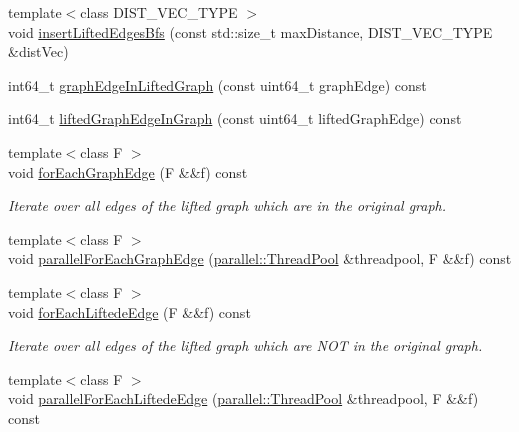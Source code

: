 \begin{DoxyCompactItemize}
\item 
{\footnotesize template$<$class D\+I\+S\+T\+\_\+\+V\+E\+C\+\_\+\+T\+Y\+PE $>$ }\\void \hyperlink{classnifty_1_1graph_1_1opt_1_1lifted__multicut_1_1LiftedMulticutObjective_ab60b55144adaaa6b75e5423b87304292}{insert\+Lifted\+Edges\+Bfs} (const std\+::size\+\_\+t max\+Distance, D\+I\+S\+T\+\_\+\+V\+E\+C\+\_\+\+T\+Y\+PE \&dist\+Vec)
\item 
int64\+\_\+t \hyperlink{classnifty_1_1graph_1_1opt_1_1lifted__multicut_1_1LiftedMulticutObjective_aef06530949ae4adf558b068481d681bb}{graph\+Edge\+In\+Lifted\+Graph} (const uint64\+\_\+t graph\+Edge) const
\item 
int64\+\_\+t \hyperlink{classnifty_1_1graph_1_1opt_1_1lifted__multicut_1_1LiftedMulticutObjective_a5f1291a372c36fe2ce47098fd2b7df6d}{lifted\+Graph\+Edge\+In\+Graph} (const uint64\+\_\+t lifted\+Graph\+Edge) const
\item 
{\footnotesize template$<$class F $>$ }\\void \hyperlink{classnifty_1_1graph_1_1opt_1_1lifted__multicut_1_1LiftedMulticutObjective_a9eb69dc38ef42983fe07545152a8295c}{for\+Each\+Graph\+Edge} (F \&\&f) const
\begin{DoxyCompactList}\small\item\em Iterate over all edges of the lifted graph which are in the original graph. \end{DoxyCompactList}\item 
{\footnotesize template$<$class F $>$ }\\void \hyperlink{classnifty_1_1graph_1_1opt_1_1lifted__multicut_1_1LiftedMulticutObjective_a0d353d5debd28ebd2da2404f1f5a4a6a}{parallel\+For\+Each\+Graph\+Edge} (\hyperlink{classnifty_1_1parallel_1_1ThreadPool}{parallel\+::\+Thread\+Pool} \&threadpool, F \&\&f) const
\item 
{\footnotesize template$<$class F $>$ }\\void \hyperlink{classnifty_1_1graph_1_1opt_1_1lifted__multicut_1_1LiftedMulticutObjective_a958316ea378fee2470efd34fbd424661}{for\+Each\+Liftede\+Edge} (F \&\&f) const
\begin{DoxyCompactList}\small\item\em Iterate over all edges of the lifted graph which are N\+OT in the original graph. \end{DoxyCompactList}\item 
{\footnotesize template$<$class F $>$ }\\void \hyperlink{classnifty_1_1graph_1_1opt_1_1lifted__multicut_1_1LiftedMulticutObjective_a807981c8163e887605b6c009b3765306}{parallel\+For\+Each\+Liftede\+Edge} (\hyperlink{classnifty_1_1parallel_1_1ThreadPool}{parallel\+::\+Thread\+Pool} \&threadpool, F \&\&f) const
\end{DoxyCompactItemize}
